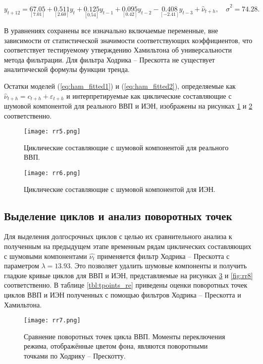 \documentclass[a4paper,14pt]{extreport}
\begin{document}
	\begin{equation}
		y_{t+12} = \underset{[7.01]}{67.05} 
		+ \underset{[2.60]}{0.511} y_{t}
		+ \underset{[0.54]}{0.125} y_{t-1}
		+ \underset{[0.42]}{0.095} y_{t-2}
		- \underset{[-2.41]}{0.408} y_{t-3}
		+ \hat{\nu}_{t+h}, \quad \hat{\sigma}^2=74.28 .
		\label{eq:ham_fitted2}
	\end{equation}
	
	В уравнениях сохранены все изначально включаемые переменные, вне зависимости от статистической значимости соответствующих коэффициентов, что соответствует тестируемому утверждению Хамильтона об универсальности метода фильтрации. Для фильтра Ходрика -- Прескотта не существует аналитической формулы функции тренда.

	Остатки моделей (\ref{eq:ham_fitted1}) и (\ref{eq:ham_fitted2}), определяемые как $\hat{\nu}_{t+h} = c_{t+h} + \varepsilon_{t+h}$ и интерпретируемые как циклические составляющие с шумовой компонентой для реального ВВП и ИЭН, изображены на рисунках \ref{fig:rr5} и \ref{fig:rr6} соответственно.
	
	\begin{figure}
		\texttt{[image: rr5.png]}
		\caption{
			Циклические составляющие с шумовой компонентой для реального ВВП.
		}
		\label{fig:rr5}
	\end{figure}	
	
	\begin{figure}
		\texttt{[image: rr6.png]}
		\caption{
			Циклические составляющие с шумовой компонентой для ИЭН.
		}
		\label{fig:rr6}
	\end{figure}	

	\subsection{Выделение циклов и анализ поворотных точек}
	
	Для выделения долгосрочных циклов с целью их сравнительного анализа к полученным на предыдущем этапе временным рядам  циклических составляющих с шумовыми компонентами $\hat{\nu_t}$ применяется фильтр Ходрика -- Прескотта с параметром  $\lambda=13.93$. Это позволяет удалить шумовые компоненты и получить гладкие кривые циклов для ВВП и ИЭН, представляемые на рисунках \ref{fig:rr7} и \ref{fig:rr8} соответственно. 
	В таблице \ref{tbl:tpoints_re} приведены оценки поворотных точек циклов ВВП и ИЭН полученных с помощью фильтров Ходрика -- Прескотта и Хамильтона. 
	
	
	\begin{figure}
		\texttt{[image: rr7.png]}
		\caption{
			Сравнение поворотных точек цикла ВВП. Моменты переключения режима, отображённые цветом фона, являются поворотными точками по Ходрику -- Прескотту. 
		}
		\label{fig:rr7}
	\end{figure}	
	
\end{document}
